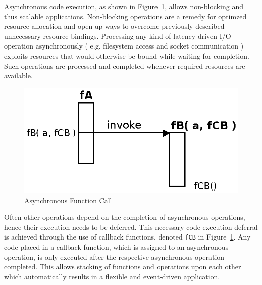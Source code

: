 Asynchronous code execution, as shown in Figure~\ref{fig:Closures_Asynchronous}, allows non-blocking and thus scalable applications.
Non-blocking operations are a remedy for optimzed resource allocation and open up ways to overcome previously described unnecessary resource bindings.
Processing any kind of latency-driven I/O operation asynchronously ( e.g. filesystem access and socket communication ) exploits resources that would otherwise be bound while waiting for completion.
Such operations are processed and completed whenever required resources are available.
\begin{figure}[!ht]
	\centering
  \includegraphics{figures/Closures_Asynchronous}
	\caption{Asynchronous Function Call}
	\label{fig:Closures_Asynchronous}
\end{figure}


Often other operations depend on the completion of asynchronous operations, hence their execution needs to be deferred.
This necessary code execution deferral is achieved through the use of callback functions, denoted \texttt{fCB} in Figure~\ref{fig:Closures_Asynchronous}.
Any code placed in a callback function, which is assigned to an asynchronous operation, is only executed after the respective asynchronous operation completed.
This allows stacking of functions and operations upon each other which automatically results in a flexible and event-driven application.


